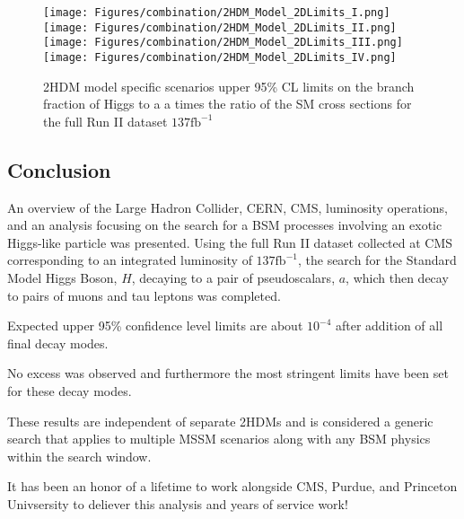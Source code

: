 \begin{figure}[ht!b]
  \centering
  \texttt{[image: Figures/combination/2HDM\_Model\_2DLimits\_I.png]}
  \texttt{[image: Figures/combination/2HDM\_Model\_2DLimits\_II.png]}\\
  \texttt{[image: Figures/combination/2HDM\_Model\_2DLimits\_III.png]}
  \texttt{[image: Figures/combination/2HDM\_Model\_2DLimits\_IV.png]}\\
    \caption{\label{fig:2HDM} 2HDM model specific scenarios upper 95\% CL limits on the branch fraction of Higgs to a a times the ratio of the SM cross sections for the full Run II dataset $\text{137}\text{fb}^{-1}$ }
\end{figure}

\clearpage

\subsection{Conclusion}
\label{sec:conc}
An overview of the Large Hadron Collider, CERN, CMS, luminosity operations, and an analysis focusing on the search for a BSM processes involving an exotic Higgs-like particle was presented.
Using the full Run II dataset collected at CMS corresponding to an integrated luminosity of $\text{137}\text{fb}^{-1}$, the search for the Standard Model Higgs Boson, $H$, decaying to a pair of pseudoscalars, $a$, which then decay to pairs of muons and tau leptons was completed. 

Expected upper 95\% confidence level limits are about $10^{-4}$ after addition of all final decay modes. 


No excess was observed and furthermore the most stringent limits have been set for these decay modes. 


These results are independent of separate 2HDMs and is considered a generic search that applies to multiple MSSM scenarios along with any BSM physics within the search window. 

It has been an honor of a lifetime to work alongside CMS, Purdue, and Princeton Univsersity to deliever this analysis and years of service work! 
